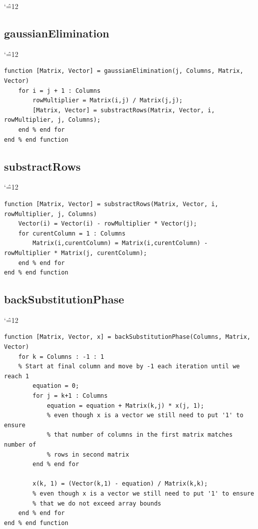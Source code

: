 \documentclass[12pt]{report}
\newenvironment{simplechar}{%
   \catcode`\^=12
}{}
\begin{document}
\begin{simplechar}
\newpage
\subsection{gaussianElimination}
\begin{simplechar}
\begin{lstlisting}
function [Matrix, Vector] = gaussianElimination(j, Columns, Matrix, Vector)
    for i = j + 1 : Columns
        rowMultiplier = Matrix(i,j) / Matrix(j,j);
        [Matrix, Vector] = substractRows(Matrix, Vector, i, rowMultiplier, j, Columns);
    end % end for
end % end function
\end{lstlisting}
\end{simplechar}

\subsection{substractRows}
\begin{simplechar}
\begin{lstlisting}
function [Matrix, Vector] = substractRows(Matrix, Vector, i, rowMultiplier, j, Columns)
    Vector(i) = Vector(i) - rowMultiplier * Vector(j);
    for curentColumn = 1 : Columns
        Matrix(i,curentColumn) = Matrix(i,curentColumn) - rowMultiplier * Matrix(j, curentColumn);
    end % end for
end % end function
\end{lstlisting}
\end{simplechar}

\newpage
\subsection{backSubstitutionPhase}
\begin{simplechar}
\begin{lstlisting}
function [Matrix, Vector, x] = backSubstitutionPhase(Columns, Matrix, Vector)
    for k = Columns : -1 : 1
    % Start at final column and move by -1 each iteration until we reach 1
        equation = 0;
        for j = k+1 : Columns
            equation = equation + Matrix(k,j) * x(j, 1);
            % even though x is a vector we still need to put '1' to ensure
            % that number of columns in the first matrix matches number of
            % rows in second matrix
        end % end for

        x(k, 1) = (Vector(k,1) - equation) / Matrix(k,k);
        % even though x is a vector we still need to put '1' to ensure
        % that we do not exceed array bounds
    end % end for
end % end function
\end{lstlisting}
\end{simplechar}


\end{simplechar}
\end{document}
